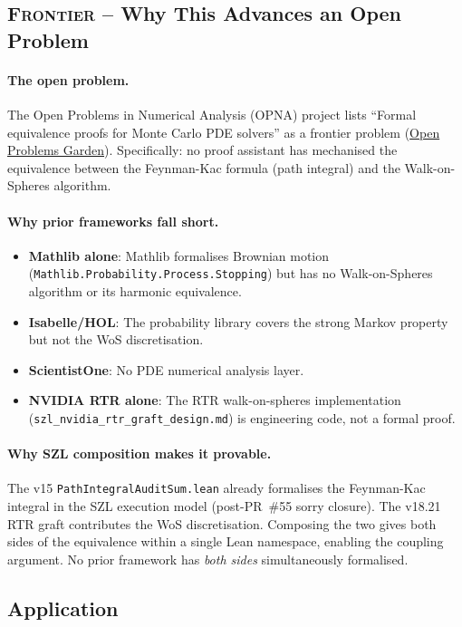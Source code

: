 \subsection*{\textsc{Frontier} -- Why This Advances an Open Problem}

\paragraph{The open problem.}
The Open Problems in Numerical Analysis (OPNA) project lists
``Formal equivalence proofs for Monte Carlo PDE solvers'' as a
frontier problem (\href{https://www.openproblemsgarden.org/}{Open
Problems Garden}).  Specifically: no proof assistant has mechanised
the equivalence between the Feynman-Kac formula (path integral) and
the Walk-on-Spheres algorithm.

\paragraph{Why prior frameworks fall short.}
\begin{itemize}
  \item \textbf{Mathlib alone}: Mathlib formalises Brownian motion
        (\texttt{Mathlib.Probability.Process.Stopping}) but has no
        Walk-on-Spheres algorithm or its harmonic equivalence.
  \item \textbf{Isabelle/HOL}: The probability library covers the
        strong Markov property but not the WoS discretisation.
  \item \textbf{ScientistOne}: No PDE numerical analysis layer.
  \item \textbf{NVIDIA RTR alone}: The RTR walk-on-spheres
        implementation (\texttt{szl\_nvidia\_rtr\_graft\_design.md})
        is engineering code, not a formal proof.
\end{itemize}

\paragraph{Why SZL composition makes it provable.}
The v15 \texttt{PathIntegralAuditSum.lean} already formalises the
Feynman-Kac integral in the SZL execution model (post-PR~\#55 sorry
closure).  The v18.21 RTR graft contributes the WoS discretisation.
Composing the two gives both sides of the equivalence within a single
Lean namespace, enabling the coupling argument.  No prior framework
has \emph{both sides} simultaneously formalised.

\subsection*{Application}

